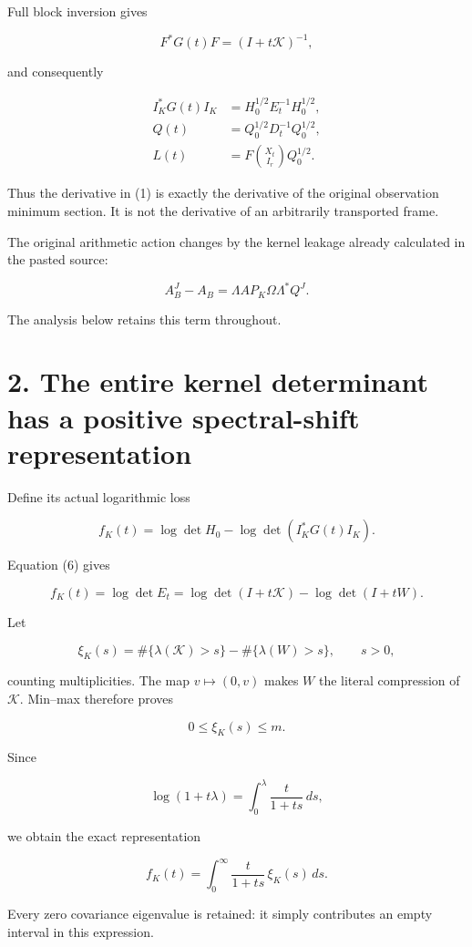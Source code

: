 Full block inversion gives

\[
F^*G(t)F=(I+t\mathcal K)^{-1},
\]

and consequently

\[
\boxed{
\begin{aligned}
I_K^*G(t)I_K&=H_0^{1/2}E_t^{-1}H_0^{1/2},\\
Q(t)&=Q_0^{1/2}D_t^{-1}Q_0^{1/2},\\
L(t)&=F\binom{X_t}{I_r}Q_0^{1/2}.
\end{aligned}}
\tag{6}
\]

Thus the derivative in (1) is exactly the derivative of the original observation minimum section. It is not the derivative of an arbitrarily transported frame.

The original arithmetic action changes by the kernel leakage already calculated in the pasted source:

\[
A_B^J-A_B
=\Lambda A P_K\Omega\Lambda^*Q^J.
\]

The analysis below retains this term throughout.

\section{2. The entire kernel determinant has a positive spectral-shift representation}\label{the-entire-kernel-determinant-has-a-positive-spectral-shift-representation}

Define its actual logarithmic loss

\[
f_K(t)
=
\log\det H_0-\log\det(I_K^*G(t)I_K).
\]

Equation (6) gives

\[
\boxed{
f_K(t)
=\log\det E_t
=\log\det(I+t\mathcal K)-\log\det(I+tW).
}
\tag{7}
\]

Let

\[
\xi_K(s)
=
\#\{\lambda(\mathcal K)>s\}
-\#\{\lambda(W)>s\},
\qquad s>0,
\]

counting multiplicities. The map \(v\mapsto(0,v)\) makes \(W\) the literal compression of \(\mathcal K\). Min--max therefore proves

\[
0\le\xi_K(s)\le m.
\tag{8}
\]

Since

\[
\log(1+t\lambda)
=\int_0^\lambda\frac{t}{1+ts}\,ds,
\]

we obtain the exact representation

\[
\boxed{
f_K(t)=
\int_0^\infty\frac{t}{1+ts}\,\xi_K(s)\,ds.
}
\tag{9}
\]

Every zero covariance eigenvalue is retained: it simply contributes an empty interval in this expression.

